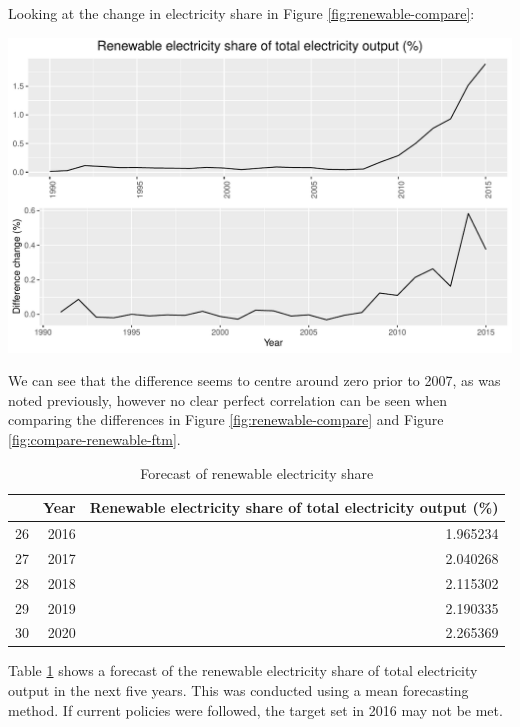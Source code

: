 \documentclass[11pt,a4paper,]{article}
\let\origfigure\figure
\let\endorigfigure\endfigure
\renewenvironment{figure}[1][2] {
    \expandafter\origfigure\expandafter[H]
} {
    \endorigfigure
}%
\begin{document}
Looking at the change in electricity share in Figure \ref{fig:renewable-compare}:

\begin{figure}
\centering
\includegraphics{report_files/figure-latex/renewable-compare-1.pdf}
\caption{\label{fig:renewable-compare}Looking at Renewable electricity share, and difference change}
\end{figure}

We can see that the difference seems to centre around zero prior to 2007, as was noted previously, however no clear perfect correlation can be seen when comparing the differences in Figure \ref{fig:renewable-compare} and Figure \ref{fig:compare-renewable-ftm}.

\pagebreak

\begin{table}[!h]

\caption{\label{tab:fcrenew}Forecast of renewable electricity share}
\centering
\fontsize{10}{12}\selectfont
\begin{tabular}[t]{lrr}
\toprule
  & Year & Renewable electricity share of total electricity output (\%)\\
\midrule
26 & 2016 & 1.965234\\
27 & 2017 & 2.040268\\
28 & 2018 & 2.115302\\
29 & 2019 & 2.190335\\
30 & 2020 & 2.265369\\
\bottomrule
\end{tabular}
\end{table}

Table \ref{tab:fcrenew} shows a forecast of the renewable electricity share of total electricity output in the next five years. This was conducted using a mean forecasting method. If current policies were followed, the target set in 2016 may not be met.
\end{document}
